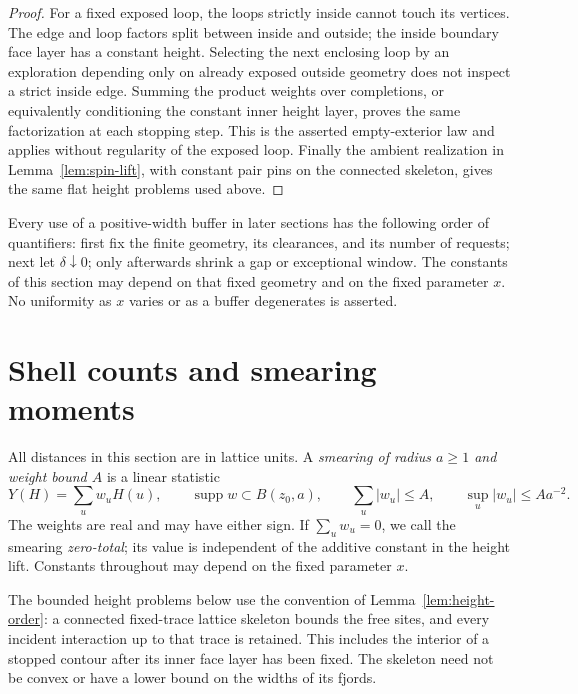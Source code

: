 \documentclass[11pt]{article}
\theoremstyle{definition}
\theoremstyle{remark}
\numberwithin{equation}{section}
\begin{document}
\begin{proof}
For a fixed exposed loop, the loops strictly inside cannot touch its
vertices. The edge and loop factors split between inside and outside;
the inside boundary face layer has a constant height. Selecting the next
enclosing loop by an exploration depending only on already exposed
outside geometry does not inspect a strict inside edge. Summing the
product weights over completions, or equivalently conditioning the
constant inner height layer, proves the same factorization at each
stopping step. This is the asserted empty-exterior law and applies
without regularity of the exposed loop. Finally the ambient realization
in Lemma~\ref{lem:spin-lift}, with constant pair pins on the connected
skeleton, gives the same flat height problems used above.
\end{proof}

Every use of a positive-width buffer in later sections has the following
order of quantifiers: first fix the finite geometry, its clearances, and
its number of requests; next let $\delta\downarrow0$; only afterwards
shrink a gap or exceptional window. The constants of this section may
depend on that fixed geometry and on the fixed parameter $x$. No
uniformity as $x$ varies or as a buffer degenerates is asserted.

\section{Shell counts and smearing moments}\label{sec:moments}

All distances in this section are in lattice units.  A \emph{smearing of
radius $a\geq1$ and weight bound $A$} is a linear statistic
\begin{equation}\label{moments:weights}
 Y(H)=\sum_u w_uH(u),\qquad
 \operatorname{supp} w\subset B(z_0,a),\qquad
 \sum_u|w_u|\leq A,\qquad \sup_u|w_u|\leq Aa^{-2}.
\end{equation}
The weights are real and may have either sign.  If $\sum_uw_u=0$, we
call the smearing \emph{zero-total}; its value is independent of the
additive constant in the height lift.  Constants throughout may depend
on the fixed parameter $x$.

The bounded height problems below use the convention of
Lemma~\ref{lem:height-order}: a connected fixed-trace lattice skeleton
bounds the free sites, and every incident interaction up to that trace
is retained.  This includes the interior of a stopped contour after its
inner face layer has been fixed.  The skeleton need not be convex or
have a lower bound on the widths of its fjords.
\end{document}
